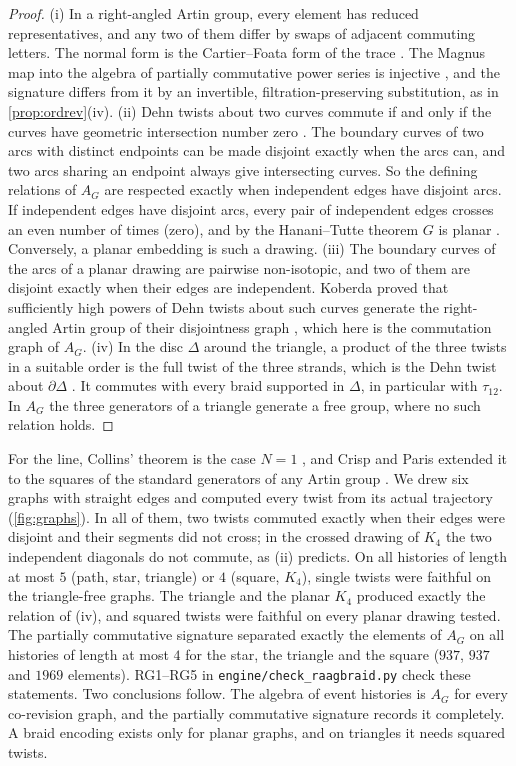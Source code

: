\documentclass[11pt]{article}
\theoremstyle{definition}\newtheorem{definition}[theorem]{Definition}\newtheorem{remark}[theorem]{Remark}\newtheorem{example}[theorem]{Example}\newtheorem{problem}[theorem]{Open problem}\crefname{problem}{Problem}{Problems}
\begin{document}
\begin{proof}
(i) In a right-angled Artin group, every element has reduced representatives, and any two of them differ by swaps of adjacent commuting letters. The normal form is the Cartier--Foata form of the trace \cite{CartierFoata1969}. The Magnus map into the algebra of partially commutative power series is injective \cite{DuchampKrob1992}, and the signature differs from it by an invertible, filtration-preserving substitution, as in \cref{prop:ordrev}(iv). (ii) Dehn twists about two curves commute if and only if the curves have geometric intersection number zero \cite{FarbMargalit2012}. The boundary curves of two arcs with distinct endpoints can be made disjoint exactly when the arcs can, and two arcs sharing an endpoint always give intersecting curves. So the defining relations of $A_G$ are respected exactly when independent edges have disjoint arcs. If independent edges have disjoint arcs, every pair of independent edges crosses an even number of times (zero), and by the Hanani--Tutte theorem $G$ is planar \cite{Tutte1970,PelsmajerSchaeferStefankovic2007}. Conversely, a planar embedding is such a drawing. (iii) The boundary curves of the arcs of a planar drawing are pairwise non-isotopic, and two of them are disjoint exactly when their edges are independent. Koberda proved that sufficiently high powers of Dehn twists about such curves generate the right-angled Artin group of their disjointness graph \cite{Koberda2012}, which here is the commutation graph of $A_G$. (iv) In the disc $\Delta$ around the triangle, a product of the three twists in a suitable order is the full twist of the three strands, which is the Dehn twist about $\partial\Delta$ \cite{Birman1974}. It commutes with every braid supported in $\Delta$, in particular with $\tau_{12}$. In $A_G$ the three generators of a triangle generate a free group, where no such relation holds.
\end{proof}

For the line, Collins' theorem is the case $N=1$ \cite{Collins1994}, and Crisp and Paris extended it to the squares of the standard generators of any Artin group \cite{CrispParis2001}. We drew six graphs with straight edges and computed every twist from its actual trajectory (\cref{fig:graphs}). In all of them, two twists commuted exactly when their edges were disjoint and their segments did not cross; in the crossed drawing of $K_4$ the two independent diagonals do not commute, as (ii) predicts. On all histories of length at most $5$ (path, star, triangle) or $4$ (square, $K_4$), single twists were faithful on the triangle-free graphs. The triangle and the planar $K_4$ produced exactly the relation of (iv), and squared twists were faithful on every planar drawing tested. The partially commutative signature separated exactly the elements of $A_G$ on all histories of length at most $4$ for the star, the triangle and the square ($937$, $937$ and $1969$ elements). RG1--RG5 in \texttt{engine/check\_raagbraid.py} check these statements. Two conclusions follow. The algebra of event histories is $A_G$ for every co-revision graph, and the partially commutative signature records it completely. A braid encoding exists only for planar graphs, and on triangles it needs squared twists.
\end{document}
